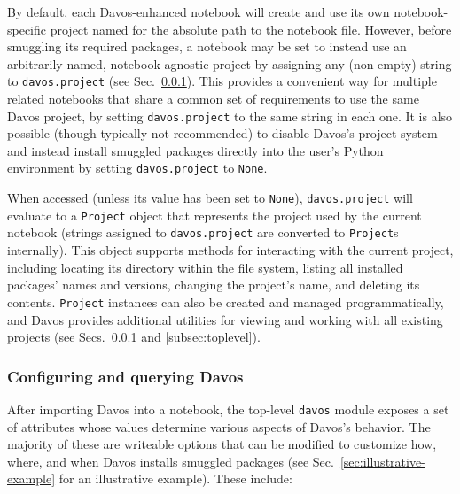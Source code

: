 \documentclass[preprint,12pt,a4paper]{elsarticle}
\begin{document}
By default, each Davos-enhanced notebook will create and use its own notebook-specific project named for the absolute path to the notebook file.
However, before smuggling its required packages, a notebook may be set to instead use an arbitrarily named, notebook-agnostic project by assigning any (non-empty) string to \texttt{davos.project} (see Sec.~\ref{subsec:config}).
This provides a convenient way for multiple related notebooks that share a common set of requirements to use the same Davos project, by setting \texttt{davos.project} to the same string in each one.
It is also possible (though typically not recommended) to disable Davos's project system and instead install smuggled packages directly into the user's Python environment by setting \texttt{davos.project} to \texttt{None}.

When accessed (unless its value has been set to \texttt{None}), \texttt{davos.project} will evaluate to a \texttt{Project} object that represents the project used by the current notebook (strings assigned to \texttt{davos.project} are converted to \texttt{Project}s internally). This object supports methods for interacting with the current project, including locating its directory within the file system, listing all installed packages' names and versions, changing the project's name, and deleting its contents.
\texttt{Project} instances can also be created and managed programmatically, and Davos provides additional utilities for viewing and working with all existing projects (see Secs.~\ref{subsec:config} and \ref{subsec:toplevel}).


\subsubsection{Configuring and querying Davos}\label{subsec:config}

After importing Davos into a notebook, the top-level \texttt{davos} module exposes a set of attributes whose values determine various aspects of Davos's behavior.
The majority of these are writeable options that can be modified to customize how, where, and when Davos installs smuggled packages (see Sec.~\ref{sec:illustrative-example} for an illustrative example).
These include:
\end{document}
